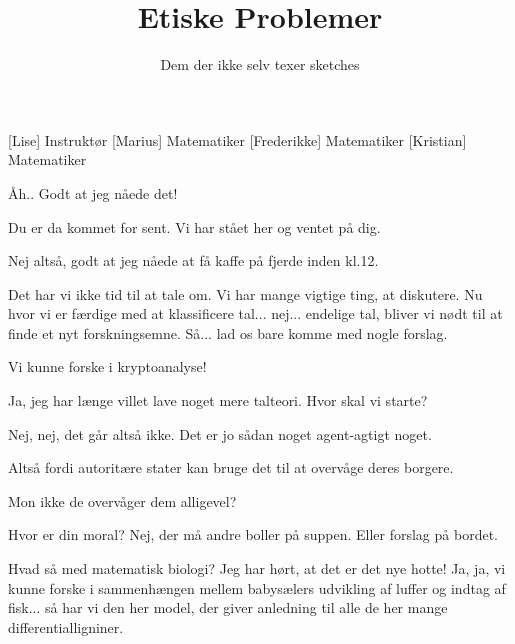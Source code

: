 \documentclass[a4paper,11pt]{article}
\title{Etiske Problemer}
\author{Dem der ikke selv texer sketches}
\begin{document}
\maketitle

\begin{roles}
[Lise] Instruktør
[Marius] Matematiker
[Frederikke] Matematiker
[Kristian] Matematiker 
\end{roles}

\begin{props}
\end{props}


\begin{sketch}




 Åh.. Godt at jeg nåede det! 

 Du er da kommet for sent. Vi har stået her og ventet på dig. 

 Nej altså, godt at jeg nåede at få kaffe på fjerde inden kl.12. 

 Det har vi ikke tid til at tale om. Vi har mange vigtige ting, at diskutere. Nu hvor vi er færdige med at klassificere tal... nej... endelige tal, bliver vi nødt til at finde et nyt forskningsemne. Så... lad os bare komme med nogle forslag.


 Vi kunne forske i kryptoanalyse!

 Ja, jeg har længe villet lave noget mere talteori. Hvor skal vi starte?

 Nej, nej, det går altså ikke. Det er jo sådan noget agent-agtigt noget. 

 Altså fordi autoritære stater kan bruge det til at overvåge deres borgere. 


 Mon ikke de overvåger dem alligevel?

 Hvor er din moral? Nej, der må andre boller på suppen. Eller forslag på bordet. 


 Hvad så med matematisk biologi? Jeg har hørt, at det er det nye hotte! Ja, ja, vi kunne forske i sammenhængen mellem babysælers udvikling af luffer og indtag af fisk...  så har vi den her model, der giver anledning til alle de her mange differentialligniner. 


\end{sketch}
\end{document}

